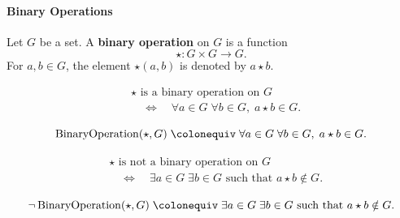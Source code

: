 \paragraph{Binary Operations}




\begin{tcolorbox}[title={Definition --- Binary Operation}]
\begin{definition}
\label{def:binary-operation}
Let $G$ be a set. A \textbf{binary operation} on $G$ is a function
\[
\star : G \times G \to G.
\]
For $a, b \in G$, the element $\star(a,b)$ is denoted by $a \star b$.
\end{definition}
\end{tcolorbox}

\begin{remark*}
\[
\begin{aligned}
&\star \text{ is a binary operation on } G \\
&\quad\Longleftrightarrow\quad
\forall a \in G\;\forall b \in G,\; a \star b \in G.
\end{aligned}
\]
\end{remark*}

\begin{remark*}
\[
\operatorname{BinaryOperation}(\star, G)
\;\colonequiv\;
\forall a \in G\;\forall b \in G,\; a \star b \in G.
\]
\end{remark*}

\begin{remark*}
\[
\begin{aligned}
&\star \text{ is not a binary operation on } G \\
&\quad\Longleftrightarrow\quad
\exists a \in G\;\exists b \in G \text{ such that } a \star b \notin G.
\end{aligned}
\]
\end{remark*}

\begin{remark*}
\[
\neg \operatorname{BinaryOperation}(\star, G)
\;\colonequiv\;
\exists a \in G\;\exists b \in G \text{ such that } a \star b \notin G.
\]
\end{remark*}

